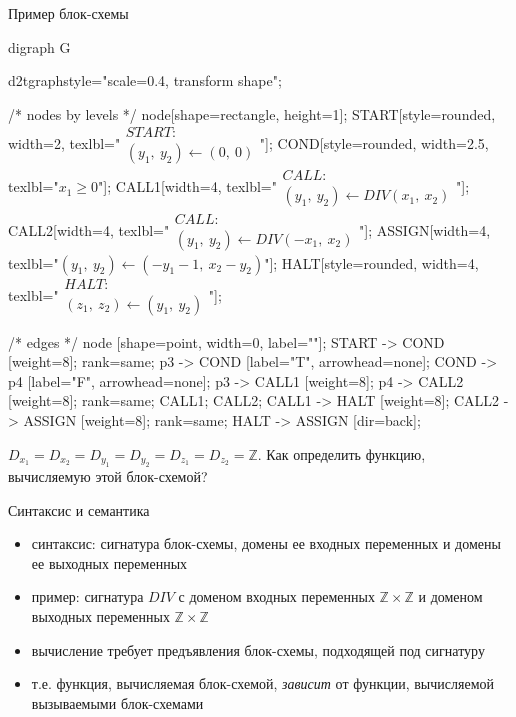 \documentclass[hyperref={unicode=true}]{beamer}
\begin{document}
	\begin{frame}[fragile]{Пример блок-схемы}

	\huge
	\begin{dot2tex}[options=-traw]
	digraph G{
		d2tgraphstyle="scale=0.4, transform shape";

		/* nodes by levels */
		node[shape=rectangle, height=1];
		START[style=rounded, width=2, texlbl="$\begin{matrix}START:\\(y_1,~y_2) \leftarrow (0,~0)\end{matrix}$"];
        COND[style=rounded, width=2.5, texlbl="$x_1 \geq 0$"];
		CALL1[width=4, texlbl="$\begin{matrix}CALL:\\(y_1,~y_2) \leftarrow DIV(x_1,~x_2)\end{matrix}$"];
		CALL2[width=4, texlbl="$\begin{matrix}CALL:\\(y_1,~y_2) \leftarrow DIV(-x_1,~x_2)\end{matrix}$"];
		ASSIGN[width=4, texlbl="$(y_1,~y_2) \leftarrow (-y_1-1,~x_2 - y_2)$"];
        HALT[style=rounded, width=4, texlbl="$\begin{matrix}HALT:\\(z_1,~z_2) \leftarrow (y_1,~y_2)\end{matrix}$"];

		/* edges */
		node [shape=point, width=0, label=""];
		START -> COND [weight=8];
		{ rank=same; p3 -> COND [label="T", arrowhead=none]; COND -> p4 [label="F", arrowhead=none]; }
		p3 -> CALL1 [weight=8];
		p4 -> CALL2 [weight=8];
		{ rank=same; CALL1; CALL2; }
		CALL1 -> HALT [weight=8];
		CALL2 -> ASSIGN [weight=8];
		{ rank=same; HALT -> ASSIGN [dir=back]; }
        }
	\end{dot2tex}

	\normalsize

    $D_{x_1} = D_{x_2} = D_{y_1} = D_{y_2} = D_{z_1} = D_{z_2} = \mathbb{Z}$.
    Как определить функцию, вычисляемую этой блок-схемой?
	\end{frame}

    \begin{frame}{Синтаксис и семантика}
    \begin{itemize}
    \item синтаксис: сигнатура блок-схемы, домены ее входных переменных и
            домены ее выходных переменных
    \item пример: сигнатура $DIV$ с
          доменом входных переменных $\mathbb{Z} \times \mathbb{Z}$ и
          доменом выходных переменных $\mathbb{Z} \times \mathbb{Z}$
    \item вычисление требует предъявления блок-схемы, подходящей под сигнатуру
    \item т.е. функция, вычисляемая блок-схемой, \emph{зависит}
          от функции, вычисляемой вызываемыми блок-схемами
    \end{itemize}
    \end{frame}
\end{document}
